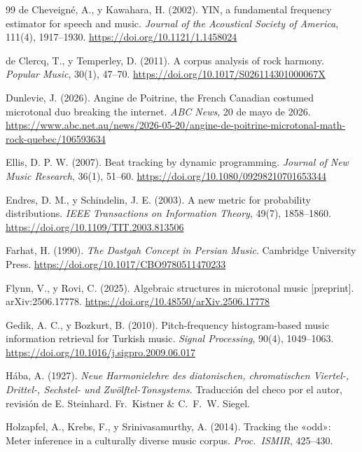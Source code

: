 \begin{thebibliography}{99}
de Cheveigné, A., y Kawahara, H. (2002). YIN, a fundamental frequency estimator for speech and music. \emph{Journal of
the Acoustical Society of America}, 111(4), 1917--1930. \url{https://doi.org/10.1121/1.1458024}

de Clercq, T., y Temperley, D. (2011). A corpus analysis of rock harmony. \emph{Popular Music}, 30(1), 47--70.
\url{https://doi.org/10.1017/S026114301000067X}

Dunlevie, J. (2026). Angine de Poitrine, the French Canadian costumed microtonal duo breaking the internet. \emph{ABC
News}, 20 de mayo de 2026.
\url{https://www.abc.net.au/news/2026-05-20/angine-de-poitrine-microtonal-math-rock-quebec/106593634}

Ellis, D. P. W. (2007). Beat tracking by dynamic programming. \emph{Journal of New Music Research}, 36(1), 51--60.
\url{https://doi.org/10.1080/09298210701653344}

Endres, D. M., y Schindelin, J. E. (2003). A new metric for probability distributions. \emph{IEEE Transactions on
Information Theory}, 49(7), 1858--1860. \url{https://doi.org/10.1109/TIT.2003.813506}

Farhat, H. (1990). \emph{The Dastgah Concept in Persian Music}. Cambridge University Press.
\url{https://doi.org/10.1017/CBO9780511470233}

Flynn, V., y Rovi, C. (2025). Algebraic structures in microtonal music [preprint]. arXiv:2506.17778.
\url{https://doi.org/10.48550/arXiv.2506.17778}

Gedik, A. C., y Bozkurt, B. (2010). Pitch-frequency histogram-based music information retrieval for Turkish music.
\emph{Signal Processing}, 90(4), 1049--1063. \url{https://doi.org/10.1016/j.sigpro.2009.06.017}

Hába, A. (1927). \emph{Neue Harmonielehre des diatonischen, chromatischen Viertel-, Drittel-, Sechstel- und
Zwölftel-Tonsystems}. Traducción del checo por el autor, revisión de E. Steinhard. Fr.\ Kistner \& C.\ F.\ W. Siegel.

Holzapfel, A., Krebs, F., y Srinivasamurthy, A. (2014). Tracking the «odd»: Meter inference in a culturally diverse
music corpus. \emph{Proc.\ ISMIR}, 425--430.


\end{thebibliography}
